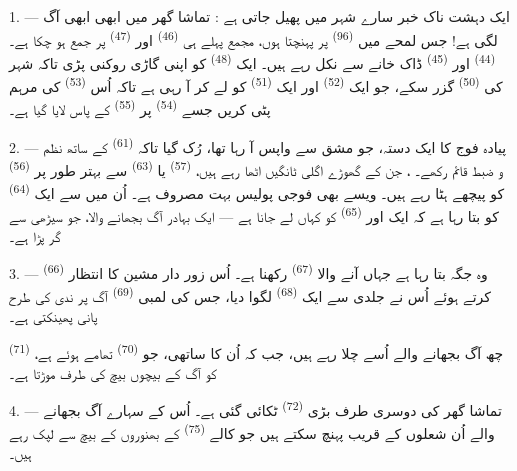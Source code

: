 \VUsaut{3.4mm}

1. --- ایک دہشت ناک خبر سارے شہر میں پھیل جاتی ہے : تماشا گھر میں
ابھی ابھی آگ لگی ہے! جس لمحے میں  \textsuperscript{(96)}
پر پہنچتا ہوں، مجمع پہلے ہی  \textsuperscript{(46)}
اور  \textsuperscript{(47)} پر جمع ہو چکا ہے۔
 \textsuperscript{(44)} اور  \textsuperscript{(45)} ڈاک خانے سے نکل رہے ہیں۔ ایک
 \textsuperscript{(48)} کو اپنی گاڑی روکنی پڑی تاکہ
شہر کی  \textsuperscript{(50)} گزر سکے، جو ایک
 \textsuperscript{(52)} اور ایک 
\textsuperscript{(51)} کو لے کر آ رہی ہے تاکہ اُس 
\textsuperscript{(53)} کی مرہم پٹی کریں جسے 
\textsuperscript{(54)} پر  \textsuperscript{(55)}
کے پاس لایا گیا ہے۔

2. --- پیادہ فوج کا ایک دستہ، جو مشق سے واپس آ رہا تھا، رُک گیا تاکہ
 \textsuperscript{(61)} کے ساتھ نظم و ضبط
قائم رکھے۔ ، جن کے گھوڑے اگلی ٹانگیں اٹھا رہے ہیں،
 \textsuperscript{(57)} یا 
\textsuperscript{(63)} سے بہتر طور پر 
\textsuperscript{(56)} کو پیچھے ہٹا رہے ہیں۔ ویسے بھی فوجی پولیس بہت
مصروف ہے۔ اُن میں سے ایک  \textsuperscript{(64)}
کو بتا رہا ہے کہ ایک اور  \textsuperscript{(65)}
کو کہاں لے جانا ہے — ایک بہادر آگ بجھانے والا، جو سیڑھی سے گر پڑا
ہے۔

3. ---  \textsuperscript{(66)} وہ جگہ بتا رہا ہے جہاں
آنے والا  \textsuperscript{(67)} رکھنا ہے۔ اُس
زور دار مشین کا انتظار کرتے ہوئے اُس نے جلدی سے ایک  \textsuperscript{(68)} لگوا دیا، جس کی لمبی 
\textsuperscript{(69)} آگ پر ندی کی طرح پانی پھینکتی ہے۔

چھ آگ بجھانے والے اُسے چلا رہے ہیں، جب کہ اُن کا ساتھی، جو
 \textsuperscript{(70)} تھامے ہوئے ہے،
 \textsuperscript{(71)} کو آگ کے بیچوں بیچ کی طرف موڑتا
ہے۔

4. --- تماشا گھر کی دوسری طرف بڑی  \textsuperscript{(72)}
ٹکائی گئی ہے۔ اُس کے سہارے آگ بجھانے والے اُن شعلوں کے قریب پہنچ
سکتے ہیں جو کالے  \textsuperscript{(75)} کے بھنوروں کے
بیچ سے لپک رہے ہیں۔

\VUsaut{5.0mm}
\VUsaut{3.4mm}

